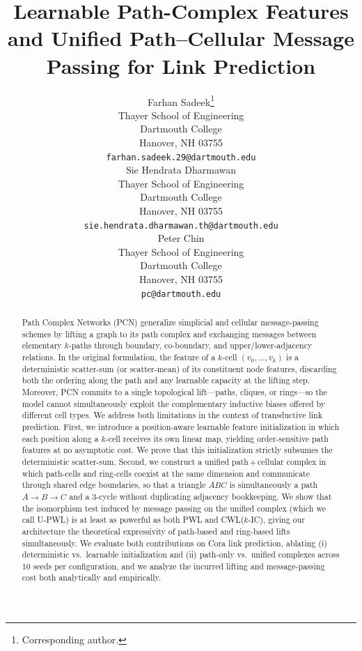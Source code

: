 \documentclass{article}
\title{Learnable Path-Complex Features and Unified Path--Cellular Message Passing for Link Prediction}
\author{%
  Farhan Sadeek\thanks{Corresponding author.} \\
  Thayer School of Engineering \\
  Dartmouth College \\
  Hanover, NH 03755 \\
  \texttt{farhan.sadeek.29@dartmouth.edu} \\
  \And
  Sie Hendrata Dharmawan \\
  Thayer School of Engineering \\
  Dartmouth College \\
  Hanover, NH 03755 \\
  \texttt{sie.hendrata.dharmawan.th@dartmouth.edu} \\
  \And
  Peter Chin \\
  Thayer School of Engineering \\
  Dartmouth College \\
  Hanover, NH 03755 \\
  \texttt{pc@dartmouth.edu} \\
}
\begin{document}
\maketitle

\begin{abstract}
  Path Complex Networks (PCN) generalize simplicial and cellular message-passing schemes by lifting a graph to its path complex and exchanging messages between elementary $k$-paths through boundary, co-boundary, and upper/lower-adjacency relations. In the original formulation, the feature of a $k$-cell $(v_0, \ldots, v_k)$ is a deterministic scatter-sum (or scatter-mean) of its constituent node features, discarding both the ordering along the path and any learnable capacity at the lifting step. Moreover, PCN commits to a single topological lift---paths, cliques, or rings---so the model cannot simultaneously exploit the complementary inductive biases offered by different cell types. We address both limitations in the context of transductive link prediction. First, we introduce a position-aware learnable feature initialization in which each position along a $k$-cell receives its own linear map, yielding order-sensitive path features at no asymptotic cost. We prove that this initialization strictly subsumes the deterministic scatter-sum. Second, we construct a unified path\,+\,cellular complex in which path-cells and ring-cells coexist at the same dimension and communicate through shared edge boundaries, so that a triangle $ABC$ is simultaneously a path $A{\to}B{\to}C$ and a $3$-cycle without duplicating adjacency bookkeeping. We show that the isomorphism test induced by message passing on the unified complex (which we call U-PWL) is at least as powerful as both PWL and CWL($k$-IC), giving our architecture the theoretical expressivity of path-based and ring-based lifts simultaneously. We evaluate both contributions on Cora link prediction, ablating (i) deterministic vs.\ learnable initialization and (ii) path-only vs.\ unified complexes across 10 seeds per configuration, and we analyze the incurred lifting and message-passing cost both analytically and empirically.
\end{abstract}
\end{document}
